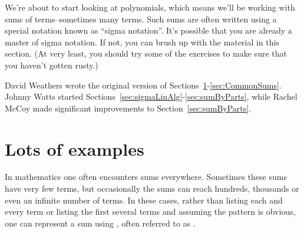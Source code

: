 


We're about to start looking at polynomials, which means we'll be working with sums of terms--sometimes many terms. Such sums are often written using a special notation known as ``sigma notation''.  It's possible that you are already a master of sigma notation. If not, you can brush up with the material in this section. (At very least, you should try some of the exercises to make sure that you haven't gotten rusty.)
\bigskip

David Weathers wrote the original version of Sections~\ref{sec:sigmaExamples}-\ref{sec:CommonSums}. Johnny Watts started Sections~\ref{sec:sigmaLinAlg}-\ref{sec:sumByParts}, while  Rachel McCoy made significant improvements to Section~\ref{sec:sumByParts}.

\section{Lots of examples\quad
{}}\label{sec:sigmaExamples}

In mathematics one often encounters sums everywhere.  Sometimes these sums have very few terms, but occasionally the sums can reach hundreds, thousands or even an infinite number of terms.  In these cases, rather than listing each and every term or listing the first several terms and assuming the pattern is obvious, one can represent a sum using , often referred to as . 

